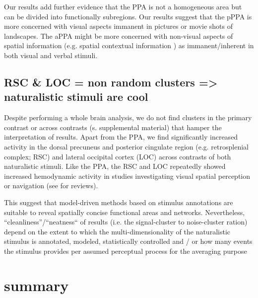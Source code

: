 \documentclass[english]{article}
\begin{document}
Our results add further evidence that the PPA is not a homogeneous area but can
be divided into functionally subregions.
Our results suggest that the pPPA is more concerned with visual aspects immanent
in pictures or movie shots of landscapes.
The aPPA might be more concerned with non-visual aspects of spatial information
(e.g. spatial contextual information \citep{aminoff2013role,
aminoff2015associative, baumann2016functional}) as immanent/inherent in both
visual and verbal stimuli.

\subsection{RSC \& LOC = non random clusters => naturalistic stimuli are
cool}

Despite performing a whole brain analysis, we do not find clusters in the
primary contrast or across contrasts (s. supplemental material) that hamper the
interpretation of results.
Apart from the PPA, we find significantly increased activity in the dorsal
precuneus and posterior cingulate region (e.g. retrosplenial complex; RSC) and
lateral occipital cortex (LOC) across contrasts of both naturalistic stimuli.
Like the PPA, the RSC and LOC repeatedly showed increased hemodynamic activity
in studies investigating visual spatial perception or navigation (see
\citep{chrastil2018heterogeneity, bettencourt2013role} for reviews).


This suggest that model-driven methods based on stimulus annotations are
suitable to reveal spatially concise functional areas and networks.
%
Nevertheless, ``cleanliness''/``neatness``  of results (i.e. the signal-cluster
to noise-cluster ration) depend on the extent to which the multi-dimensionality
of the naturalistic stimulus is annotated, modeled, statistically controlled and
/ or how many events the stimulus provides per assumed perceptual process for
the averaging purpose

\section{summary}
\end{document}
